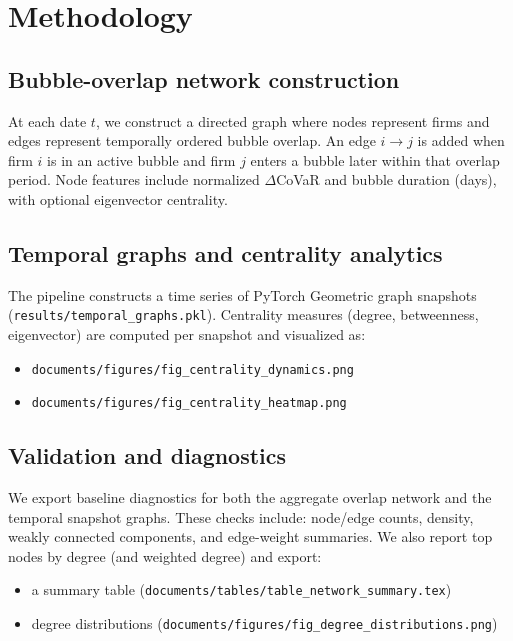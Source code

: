 \section{Methodology}

\subsection{Bubble-overlap network construction}

At each date $t$, we construct a directed graph where nodes represent firms and edges represent temporally ordered bubble overlap.
An edge $i \rightarrow j$ is added when firm $i$ is in an active bubble and firm $j$ enters a bubble later within that overlap period.
Node features include normalized $\Delta$CoVaR and bubble duration (days), with optional eigenvector centrality.

\subsection{Temporal graphs and centrality analytics}

The pipeline constructs a time series of PyTorch Geometric graph snapshots (\texttt{results/temporal\_graphs.pkl}).
Centrality measures (degree, betweenness, eigenvector) are computed per snapshot and visualized as:
\begin{itemize}
  \item \texttt{documents/figures/fig\_centrality\_dynamics.png}
  \item \texttt{documents/figures/fig\_centrality\_heatmap.png}
\end{itemize}

\subsection{Validation and diagnostics}

We export baseline diagnostics for both the aggregate overlap network and the temporal snapshot graphs.
These checks include: node/edge counts, density, weakly connected components, and edge-weight summaries.
We also report top nodes by degree (and weighted degree) and export:
\begin{itemize}
  \item a summary table (\texttt{documents/tables/table\_network\_summary.tex})
  \item degree distributions (\texttt{documents/figures/fig\_degree\_distributions.png})
\end{itemize}

